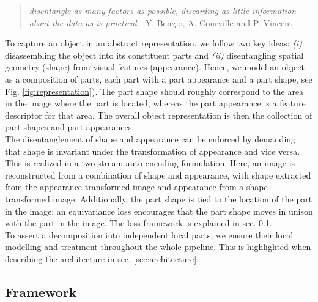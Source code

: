 \begin{quotation}
\textit{disentangle as many factors as possible, discarding as little information about the data as is practical} - Y. Bengio, A. Courville and P. Vincent \cite{bengio}
\end{quotation}
To capture an object in an abstract representation, we follow two key ideas: \emph{(i)} disassembling the object into its constituent parts and \emph{(ii)} disentangling spatial geometry (shape) from visual features (appearance). Hence, we model an object as a composition of parts, each part with a part appearance and a part shape, see Fig. \ref{fig:representation}). The part shape should roughly correspond to the area in the image where the part is located, whereas the part appearance is a feature descriptor for that area. The overall object representation is then the collection of part shapes and part appearances. \\
The disentanglement of shape and appearance can be enforced by demanding that shape is invariant under the transformation of appearance and vice versa. This is realized in a two-stream auto-encoding formulation. Here, an image is reconstructed from a combination of shape and appearance, with shape extracted from the appearance-transformed image and appearance from a shape-transformed image. Additionally, the part shape is tied to the location of the part in the image: an equivariance loss encourages that the part shape moves in unison with the part in the image. The loss framework is explained in sec. \ref{sec:framework}. \\
To assert a decomposition into independent local parts, we ensure their local modelling and treatment throughout the whole pipeline. This is highlighted when describing the architecture in sec. \ref{sec:architecture}.

\subsection{Framework}\label{sec:framework}

